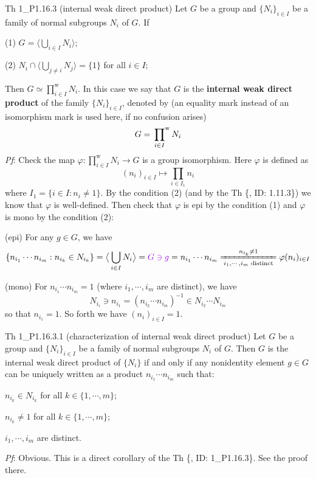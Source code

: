 \documentclass{article}
\newcommand{\wprod}[1]{\sideset{}{^\text{w}}\prod_{#1}}
\begin{document}
\begin{Th}{Th 1\_P1.16.3 (internal weak direct product)}
    Let $G$ be a group and $\{N_i\}_{i\in I}$ be a family of normal subgroups $N_i$ of $G$. If
    \begin{compactenum}
        \item[(1)] $G = \big\langle \bigcup_{i\in I} N_i \big\rangle$;
        \item[(2)] $N_i \cap \big\langle\bigcup_{j\neq i} N_j\big\rangle = \{1\}$ for all $i\in I$;
    \end{compactenum}
    Then $G \simeq \prod_{i\in I}^{\text{w}} N_i$. \textcolor{Df}{In this case we say that $G$ is the \textbf{internal weak direct product} of the family $\{N_i\}_{i\in I}$, denoted by (an equality mark instead of an isomorphism mark is used here, if no confusion arises)
    $$ G = \wprod{i\in I} N_i $$}
    \tcblower
    \textit{Pf}: Check the map $\varphi: \prod_{i\in I}^{\text{w}} N_i \to G$ is a group isomorphism. Here $\varphi$ is defined as
    $$ (n_i)_{i\in I}\mapsto \prod_{i\in I_1} n_i $$
    where $ I_1 = \{i\in I: n_i \neq 1\} $. By the condition (2) (and by the Th \{, ID: 1.11.3\}) we know that $\varphi$ is well-defined. Then check that $\varphi$ is epi by the condition (1) and $\varphi$ is mono by the condition (2):
    \begin{compactenum}
        \item (epi) For any $g\in G$, we have
        $$ \{n_{i_1}\cdots n_{i_m}: n_{i_k}\in N_{i_k}\} = \big\langle \bigcup_{i\in I} N_i \big\rangle = \textcolor{P}{G\ni g} = n_{i_1}\cdots n_{i_m} \xlongequal[i_1, \cdots, i_m \text{ distinct}]{n_{i_k}\neq 1} \varphi(n_i)_{i\in I} $$
        \item (mono) For $n_{i_1}\cdots n_{i_m} = 1$ (where $i_1, \cdots, i_m$ are distinct), we have
        $$ N_{i_i}\ni n_{i_1} = (n_{i_2}\cdots n_{i_m})^{-1} \in N_{i_2}\cdots N_{i_m} $$
        so that $n_{i_1} = 1$. So forth we have $(n_i)_{i\in I} = 1$.
    \end{compactenum}
\end{Th}

\begin{Th}{Th 1\_P1.16.3.1 (characterization of internal weak direct product)}
    Let $G$ be a group and $\{N_i\}_{i\in I}$ be a family of normal subgroups $N_i$ of $G$. Then $G$ is the internal weak direct product of $\{N_i\}$ if and only if any nonidentity element $g\in G$ can be uniquely written as a product $n_{i_1}\cdots n_{i_m}$ such that:
    \begin{compactenum}
        \item $n_{i_k}\in N_{i_k}$ for all $k\in\{1, \cdots, m\}$;
        \item $n_{i_k} \neq 1$ for all $k\in\{1, \cdots, m\}$;
        \item $i_1, \cdots, i_m$ are distinct.
    \end{compactenum}
    \tcblower
    \textit{Pf}: Obvious. This is a direct corollary of the Th \{, ID: 1\_P1.16.3\}. See the proof there.
\end{Th}
\end{document}
